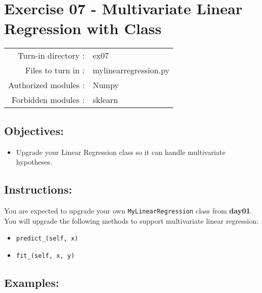 \documentclass[]{article}
\providecommand{\tightlist}{%
  \setlength{\itemsep}{0pt}\setlength{\parskip}{0pt}}
\begin{document}
\clearpage

\hypertarget{exercise-07---multivariate-linear-regression-with-class-1}{%
\section{Exercise 07 - Multivariate Linear Regression with
Class}\label{exercise-07---multivariate-linear-regression-with-class-1}}

\begin{longtable}[]{@{}rl@{}}
\toprule
\endhead
Turn-in directory : & ex07\tabularnewline
Files to turn in : & mylinearregression.py\tabularnewline
Authorized modules : & Numpy\tabularnewline
Forbidden modules : & sklearn\tabularnewline
\bottomrule
\end{longtable}

\hypertarget{objectives-5}{%
\subsection{Objectives:}\label{objectives-5}}

\begin{itemize}
\tightlist
\item
  Upgrade your Linear Regression class so it can handle multivariate
  hypotheses.
\end{itemize}

\hypertarget{instructions-6}{%
\subsection{Instructions:}\label{instructions-6}}

You are expected to upgrade your own \texttt{MyLinearRegression} class
from \textbf{day01}. You will upgrade the following methods to support
multivariate linear regression:

\begin{itemize}
\item
  \texttt{predict\_(self,\ x)}
\item
  \texttt{fit\_(self,\ x,\ y)}
\end{itemize}

\hypertarget{examples-6}{%
\subsection{Examples:}\label{examples-6}}
\end{document}
